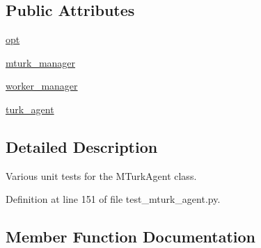 \subsection*{Public Attributes}
\begin{DoxyCompactItemize}
\item 
\hyperlink{classparlai_1_1mturk_1_1core_1_1legacy__2018_1_1test_1_1test__mturk__agent_1_1TestMTurkAgent_aa521feef50660ecffb5299ebc2ddcdb7}{opt}
\item 
\hyperlink{classparlai_1_1mturk_1_1core_1_1legacy__2018_1_1test_1_1test__mturk__agent_1_1TestMTurkAgent_a41e7f3413127521839d97699f2f6c5e6}{mturk\+\_\+manager}
\item 
\hyperlink{classparlai_1_1mturk_1_1core_1_1legacy__2018_1_1test_1_1test__mturk__agent_1_1TestMTurkAgent_aabae177920d5fcae1ba0b7291792be06}{worker\+\_\+manager}
\item 
\hyperlink{classparlai_1_1mturk_1_1core_1_1legacy__2018_1_1test_1_1test__mturk__agent_1_1TestMTurkAgent_a1f3d020994d94713b72e63632b27a64f}{turk\+\_\+agent}
\end{DoxyCompactItemize}


\subsection{Detailed Description}
\begin{DoxyVerb}Various unit tests for the MTurkAgent class.
\end{DoxyVerb}
 

Definition at line 151 of file test\+\_\+mturk\+\_\+agent.\+py.



\subsection{Member Function Documentation}
\mbox{\label{classparlai_1_1mturk_1_1core_1_1legacy__2018_1_1test_1_1test__mturk__agent_1_1TestMTurkAgent_acf817e32b90b835347cdddc019b90b15}} 
